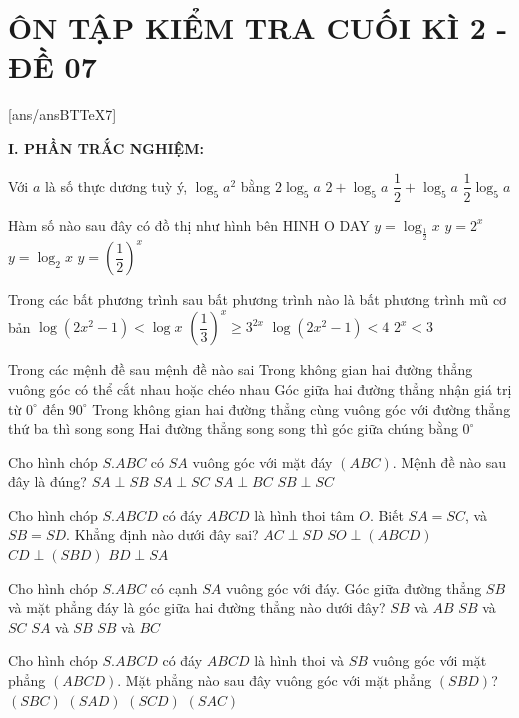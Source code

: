 \section*{ÔN TẬP KIỂM TRA CUỐI KÌ 2 - ĐỀ 07}
\setcounter{ex}{0}\setcounter{bt}{0}
[ans/ansBTTeX7]

\noindent\textbf{I. PHẦN TRẮC NGHIỆM:}
\begin{ex}
Với $a$ là số thực dương tuỳ ý, $\log _5a^2$ bằng
\choice
{$2\log _5a$}
{$2+\log _5a$}
{$\dfrac{1}{2}+\log _5a$}
{$\dfrac{1}{2}\log _5a$}
\end{ex}
\begin{ex}
Hàm số nào sau đây có đồ thị như hình bên
{\centering\color{red} HINH O DAY}
\choice
{$y=\log_{\tfrac{1}{2}}x$}
{$y=2^x$}
{$y=\log _2x$}
{$y=\left(\dfrac{1}{2}\right)^x$}
\end{ex}
\begin{ex}
Trong các bất phương trình sau bất phương trình nào là bất phương trình mũ cơ bản
\choice
{$\log \left(2x^2-1\right)<\log x$}
{${{\left(\dfrac{1}{3}\right)}^x}\ge {3^{2x}}$}
{$\log \left(2x^2-1\right)<4$}
{$2^x<3$}
\end{ex}
\begin{ex}
Trong các mệnh đề sau mệnh đề nào sai
\choice
{Trong không gian hai đường thẳng vuông góc có thể cắt nhau hoặc chéo nhau}
{Góc giữa hai đường thẳng nhận giá trị từ ${0^{\circ }}$ đến ${{90}^{\circ }}$}
{Trong không gian hai đường thẳng cùng vuông góc với đường thẳng thứ ba thì song song}
{Hai đường thẳng song song thì góc giữa chúng bằng ${0^{\circ }}$}
\end{ex}
\begin{ex}
Cho hình chóp $S.ABC$ có $SA$ vuông góc với mặt đáy $(ABC)$. Mệnh đề nào sau đây là đúng?
\choice
{$SA\perp SB$}
{$SA\perp SC$}
{$SA\perp BC$}
{$SB\perp SC$}
\end{ex}
\begin{ex}
Cho hình chóp $S.ABCD$ có đáy $ABCD$ là hình thoi tâm $O$. Biết $SA=SC$, và $SB=SD$. Khẳng định nào dưới đây sai?
\choice
{$AC\perp SD$}
{$SO\perp (ABCD)$}
{$CD\perp (SBD)$}
{$BD\perp SA$}
\end{ex}
\begin{ex}
Cho hình chóp $S.ABC$ có cạnh $SA$ vuông góc với đáy. Góc giữa đường thẳng $SB$ và mặt phẳng đáy là góc giữa hai đường thẳng nào dưới đây?
\choice
{$SB$ và $AB$}
{$SB$ và $SC$}
{$SA$ và $SB$}
{$SB$ và $BC$}
\end{ex}
\begin{ex}
Cho hình chóp $S.ABCD$ có đáy $ABCD$ là hình thoi và $SB$ vuông góc với mặt phẳng $(ABCD)$. Mặt phẳng nào sau đây vuông góc với mặt phẳng $(SBD)$?
\choice
{$(SBC)$}
{$(SAD)$}
{$(SCD)$}
{$(SAC)$}
\end{ex}
